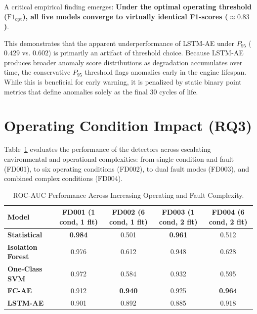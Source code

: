 \documentclass[12pt,a4paper,oneside]{report}
\begin{document}
A critical empirical finding emerges: \textbf{Under the optimal operating threshold ($\text{F1}_{\text{opt}}$), all five models converge to virtually identical F1-scores ($\approx 0.83$)}. 

This demonstrates that the apparent underperformance of LSTM-AE under $P_{95}$ ($0.429$ vs. $0.602$) is primarily an artifact of threshold choice. Because LSTM-AE produces broader anomaly score distributions as degradation accumulates over time, the conservative $P_{95}$ threshold flags anomalies early in the engine lifespan. While this is beneficial for early warning, it is penalized by static binary point metrics that define anomalies solely as the final 30 cycles of life.

\section{Operating Condition Impact (RQ3)}
Table~\ref{tab:operating_condition_impact} evaluates the performance of the detectors across escalating environmental and operational complexities: from single condition and fault (FD001), to six operating conditions (FD002), to dual fault modes (FD003), and combined complex conditions (FD004).

\begin{table}[htbp]
    \centering
    \caption{ROC-AUC Performance Across Increasing Operating and Fault Complexity.}
    \label{tab:operating_condition_impact}
    \begin{tabular}{lcccc}
        \toprule
        \textbf{Model} & \textbf{FD001} (1 cond, 1 flt) & \textbf{FD002} (6 cond, 1 flt) & \textbf{FD003} (1 cond, 2 flt) & \textbf{FD004} (6 cond, 2 flt) \\
        \midrule
        \textbf{Statistical} & \textbf{0.984} & 0.501 & \textbf{0.961} & 0.512 \\
        \textbf{Isolation Forest} & 0.976 & 0.612 & 0.948 & 0.628 \\
        \textbf{One-Class SVM} & 0.972 & 0.584 & 0.932 & 0.595 \\
        \textbf{FC-AE} & 0.912 & \textbf{0.940} & 0.925 & \textbf{0.964} \\
        \textbf{LSTM-AE} & 0.901 & 0.892 & 0.885 & 0.918 \\
        \bottomrule
    \end{tabular}
\end{table}
\end{document}

